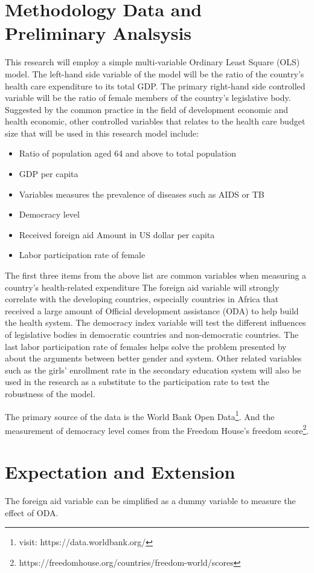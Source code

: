 \documentclass[12pt]{article}
\begin{document}
\section{Methodology Data and Preliminary Analsysis}
This research will employ a simple multi-variable Ordinary Least Square (OLS) model.
The left-hand side variable of the model will be the ratio of the country's health care expenditure to its total GDP.
The primary right-hand side controlled variable will be the ratio of female members of the country's legislative body.
Suggested by the common practice in the field of development economic and health economic, other controlled variables that relates to the health care budget size that will be used in this research model include:
\begin{itemize}
	\item Ratio of population aged 64 and above to total population
	\item GDP per capita
	\item Variables measures the prevalence of diseases such as AIDS or TB
	\item Democracy level
	\item Received foreign aid Amount in US dollar per capita
	\item Labor participation rate of female

\end{itemize}
The first three items from the above list are common variables when measuring a country's health-related expenditure
The foreign aid variable will strongly correlate with the developing countries, especially countries in Africa that received a large amount of Official development assistance (ODA) to help build the health system.
The democracy index variable will test the different influences of legislative bodies in democratic countries and non-democratic countries.
The last labor participation rate of females helps solve the problem presented by  about the arguments between better gender and system. 
Other related variables such as the girls' enrollment rate in the secondary education system will also be used in the research as a substitute to the participation rate to test the robustness of the model. 


The primary source of the data is the World Bank Open Data\footnote{visit: https://data.worldbank.org/}.
And the measurement of democracy level comes from the Freedom House's freedom score\footnote{https://freedomhouse.org/countries/freedom-world/scores}.


\section{Expectation and Extension}


The foreign aid variable can be simplified as a dummy variable to measure the effect of ODA.
\newpage


\end{document}
